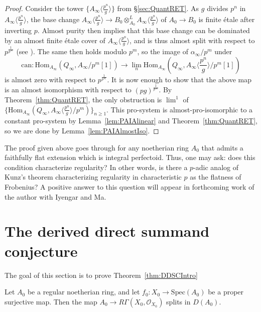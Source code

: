 \documentclass[10pt,reqno]{amsart}
\begin{document}
\begin{proof}
Consider the tower $\{A_\infty \langle \frac{p^n}{g} \rangle\}$ from \S \ref{sec:QuantRET}.  As $g$ divides $p^n$ in $A_\infty \langle \frac{p^n}{g} \rangle$, the base change $A_\infty \langle \frac{p^n}{g} \rangle \to B_0 \otimes^L_{A_0} A_\infty \langle \frac{p^n}{g} \rangle$ of $A_0 \to B_0$ is finite \'etale after inverting $p$. Almost purity \cite[Theorem 7.9 (iii)]{ScholzePerfectoidSpaces} then implies that this base change can be dominated by an almost finite \'etale cover of $A_\infty \langle \frac{p^n}{g} \rangle$, and is thus almost split with respect to $p^{\frac{1}{p^\infty}}$ (see \cite[Lemma 2.7]{BhattAlmostDSC}). The same then holds modulo $p^m$, so the image of $\alpha_\infty/p^m$ under 
\[ \mathrm{can}:\mathrm{Hom}_{A_\infty}(Q_\infty, A_\infty/p^m[1]) \to \lim_n \mathrm{Hom}_{A_\infty}(Q_\infty, A_\infty \langle \frac{p^n}{g} \rangle/p^m[1])\]
is almost zero with respect to $p^{\frac{1}{p^\infty}}$. It is now enough  to show that the above map is an almost isomorphism with respect to $(pg)^{\frac{1}{p^\infty}}$. By Theorem~\ref{thm:QuantRET}, the only obstruction is $\lim^1$ of $\{\mathrm{Hom}_{A_\infty}(Q_\infty, A_\infty \langle \frac{p^n}{g} \rangle/p^m)\}_{n \geq 1}$. This pro-system is almost-pro-isomorphic to a constant pro-system by Lemma~\ref{lem:PAIAlinear} and Theorem~\ref{thm:QuantRET}, so we are done by Lemma~\ref{lem:PAIAlmostIso}.
\end{proof}

\begin{remark}
The proof given above goes through for any noetherian ring $A_0$ that admits a faithfully flat extension which is integral perfectoid. Thus, one may ask: does this condition characterize regularity? In other words, is there a $p$-adic analog of Kunz's theorem characterizing regularity in characteristic $p$ as the flatness of Frobenius? A positive answer to this question will appear in forthcoming work of the author with Iyengar and Ma.
\end{remark}


\section{The derived direct summand conjecture}
\label{sec:DDSC}

The goal of this section is to prove Theorem~\ref{thm:DDSCIntro}

\begin{theorem}
\label{thm:DDSC}
Let $A_0$ be a regular noetherian ring, and let $f_0:X_0 \to \mathrm{Spec}(A_0)$ be a proper surjective map. Then the map $A_0 \to R\Gamma(X_0, \mathcal{O}_{X_0})$ splits in $D(A_0)$.
\end{theorem}
\end{document}
